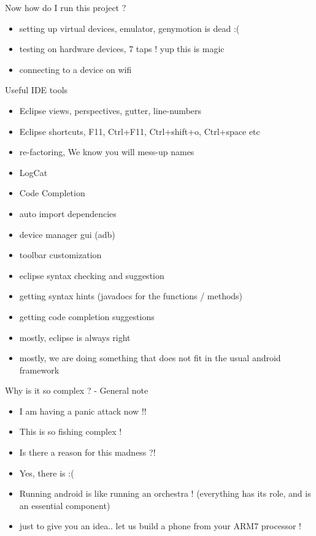 \documentclass[11pt]{beamer}
\begin{document}
\begin{frame}[containsverbatim]{Now how do I run this project ?}
	\begin{flushleft}
	\begin{itemize}
		\item setting up virtual devices, emulator, genymotion is dead :(
		\item testing on hardware devices, 7 taps ! yup this is magic
		\item connecting to a device on wifi 
	\end{itemize}
	\end{flushleft}
\end{frame}


\begin{frame}[containsverbatim]{Useful IDE tools}
	\begin{flushleft}
	\begin{itemize}
		\item Eclipse views, perspectives, gutter, line-numbers
		\item Eclipse shortcuts, F11, Ctrl+F11, Ctrl+shift+o, Ctrl+space etc
		\item re-factoring, We know you will mess-up names
		\item LogCat
		\item Code Completion
		\item auto import dependencies
		\item device manager gui (adb)
		\item toolbar customization
		\item eclipse syntax checking and suggestion
		\item getting syntax hints (javadocs for the functions / methods)
		\item getting code completion suggestions
		\item mostly, eclipse is always right
		\item mostly, we are doing something that does not fit in the usual android framework
	\end{itemize}
	\end{flushleft}
\end{frame}


\begin{frame}[containsverbatim]{Why is it so complex ? - General note}
	\begin{flushleft}
	\begin{itemize}
		\item I am having a panic attack now !!
		\item This is so fishing complex ! 
		\item Is there a reason for this madness ?!
		\item Yes, there is :(
		\item Running android is like running an orchestra !
              (everything has its role, and is an essential component)
		\item just to give you an idea.. let us build a phone from your ARM7 processor !
	\end{itemize}
	\end{flushleft}
\end{frame}
\end{document}
